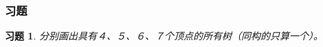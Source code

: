 \documentclass{beamer}
\newtheorem{Exercise}{习题}
\begin{document}
\begin{CJK*}{UTF8}{gbsn}
\begin{frame}
\end{frame}

\begin{frame}  
  \frametitle{习题}

  \begin{Exercise}
  分别画出具有４、５、６、７个顶点的所有树（同构的只算一个）。
  \end{Exercise}
\end{frame}

\end{CJK*}
\end{document}
